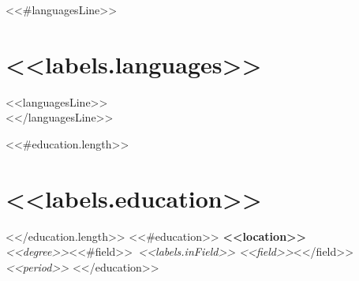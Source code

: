 \documentclass[11pt,a4paper]{article}
\begin{document}
<<#languagesLine>>
\section*{<<labels.languages>>}
\vspace{2pt}
\noindent<<languagesLine>>\\
<</languagesLine>>

<<#education.length>>
\section*{<<labels.education>>}
<</education.length>>
<<#education>>
\vspace{2pt}
\hfill{\bfseries <<location>>}\\
{\itshape <<degree>>}<<#field>>{\itshape \ <<labels.inField>> <<field>>}<</field>>\hfill{\itshape <<period>>}
\vspace{2pt}
<</education>>
\end{document}
